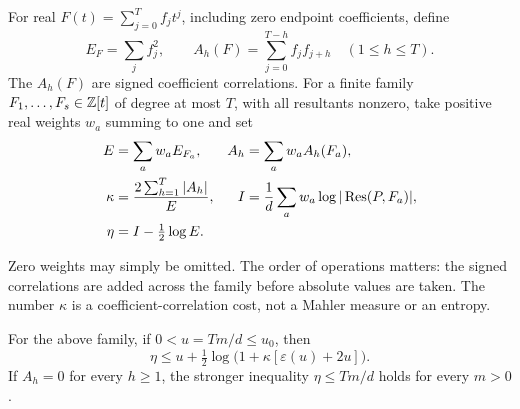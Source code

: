 \begin{definition}\label{ar:signed-bundle}
For real $F(t)=\sum_{j=0}^T f_jt^j$, including zero endpoint coefficients, define
\[
 E_F=\sum_jf_j^2,\qquad
 A_h(F)=\sum_{j=0}^{T-h}f_jf_{j+h}\quad(1\le h\le T).
\]
The $A_h(F)$ are signed coefficient correlations.
For a finite family $F_1,\ldots,F_s\in\mathbb Z[t]$ of degree at most $T$, with all resultants nonzero, take positive real weights $w_a$ summing to one and set
\begin{equation}
 \begin{aligned}
 E&=\sum_aw_a E_{F_a},&
 A_h&=\sum_aw_a A_h(F_a),\\
 \kappa&=\frac{2\sum_{h=1}^T|A_h|}{E},&
 I&=\frac1d\sum_aw_a\log|\operatorname{Res}(P,F_a)|,\\
 \eta&=I-\tfrac12\log E.
 \end{aligned}
 \label{ar:bundle-data}
\end{equation}
\end{definition}
Zero weights may simply be omitted.
The order of operations matters: the signed correlations are added across the family before absolute values are taken.
The number $\kappa$ is a coefficient-correlation cost, not a Mahler measure or an entropy.

\begin{theorem}\label{ar:bundle-bound}
For the above family, if $0<u=Tm/d\le u_0$, then
\begin{equation}
 \eta\le u+\tfrac12\log\bigl(1+\kappa[\varepsilon(u)+2u]\bigr).
 \label{ar:bundle-inequality}
\end{equation}
If $A_h=0$ for every $h\ge1$, the stronger inequality $\eta\le Tm/d$ holds for every $m>0$.
\end{theorem}

